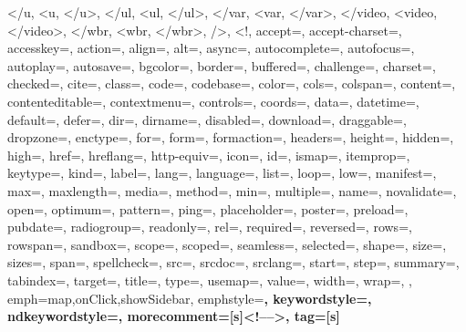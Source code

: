{{            </u, <u, </u>,
            </ul, <ul, </ul>,
            </var, <var, </var>,
            </video, <video, </video>,
            </wbr, <wbr, </wbr>,
            />, <!,
            accept=, accept-charset=, accesskey=, action=, align=, alt=, async=, autocomplete=, autofocus=, autoplay=, autosave=, bgcolor=, border=, buffered=, challenge=, charset=, checked=, cite=, class=, code=, codebase=, color=, cols=, colspan=, content=, contenteditable=, contextmenu=, controls=, coords=, data=, datetime=, default=, defer=, dir=, dirname=, disabled=, download=, draggable=, dropzone=, enctype=, for=, form=, formaction=, headers=, height=, hidden=, high=, href=, hreflang=, http-equiv=, icon=, id=, ismap=, itemprop=, keytype=, kind=, label=, lang=, language=, list=, loop=, low=, manifest=, max=, maxlength=, media=, method=, min=, multiple=, name=, novalidate=, open=, optimum=, pattern=, ping=, placeholder=, poster=, preload=, pubdate=, radiogroup=, readonly=, rel=, required=, reversed=, rows=, rowspan=, sandbox=, scope=, scoped=, seamless=, selected=, shape=, size=, sizes=, span=, spellcheck=, src=, srcdoc=, srclang=, start=, step=, summary=, tabindex=, target=, title=, type=, usemap=, value=, width=, wrap=,
            },  
            emph={map,onClick,showSidebar},
            emphstyle=\color{yellowFunction}\bfseries,
            keywordstyle=\color{editorGreen}\bfseries,
        ndkeywordstyle=\color{blue}\bfseries,
            morecomment=[s]{<!--}{-->},
            tag=[s]
    }
    
    
    
    
